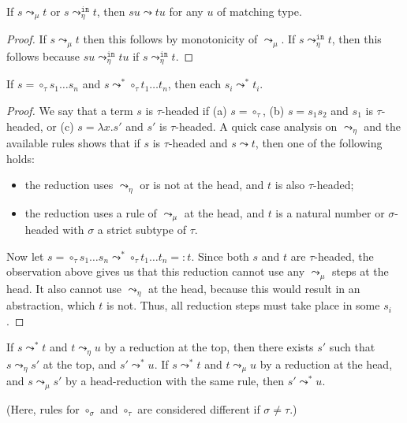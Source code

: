 \documentclass[runningheads,a4paper]{llncs}
\newcommand{\arreta}{\leadsto_\eta}
\newcommand{\arretain}{\leadsto_\eta^{\mathtt{in}}}
\newcommand{\arrnormalise}{\leadsto}
\newcommand{\normstep}{\leadsto_\mu}
\newcommand{\abs}[2]{\lambda #1.#2}
\begin{document}
\begin{lemma}\label{lem_left_monotonicity}
If $s \normstep t$ or $s \arretain t$, then $s u \arrnormalise t u$ for
any $u$ of matching type.
\end{lemma}

\begin{proof}
If $s \normstep t$ then this follows by monotonicity of $\normstep$.
If $s \arretain t$, then this follows because $s u \arretain t u$ if
$s \arretain t$.
\end{proof}

\begin{lemma}\label{lem_preserve_circ}
If $s = \circ_\tau s_1 \ldots s_n$ and $s \arrnormalise^* \circ_\tau
t_1 \ldots t_n$, then each $s_i \arrnormalise^* t_i$.
\end{lemma}

\begin{proof}
We say that a term $s$ is $\tau$-headed if (a) $s = \circ_\tau$, (b)
$s = s_1 s_2$ and $s_1$ is $\tau$-headed, or (c) $s = \abs{x}{s'}$ and
$s'$ is $\tau$-headed.  A quick case analysis on $\arreta$ and the
available rules shows that if $s$ is $\tau$-headed and $s \arrnormalise
t$, then one of the following holds:
\begin{itemize}
\item the reduction uses $\arreta$ or is not at the head, and $t$ is
  also $\tau$-headed;
\item the reduction uses a rule of $\normstep$ at the head, and $t$ is
  a natural number or $\sigma$-headed with $\sigma$ a strict subtype of
  $\tau$.
\end{itemize}

Now let $s = \circ_\tau s_1 \ldots s_n \arrnormalise^* \circ_\tau
t_1 \ldots t_n =: t$.  Since both $s$ and $t$ are $\tau$-headed, the
observation above gives us that this reduction cannot use any $\normstep$
steps at the head.  It also cannot use $\arreta$ at the head, because
this would result in an abstraction, which $t$ is not.  Thus, all
reduction steps must take place in some $s_i$.
\end{proof}

\begin{lemma}\label{lem:top_reduction}
If $s \arrnormalise^* t$ and $t \arreta u$ by a reduction at the top,
then there exists $s'$ such that $s \arreta s'$ at the top, and $s'
\arrnormalise^* u$.
If $s \arrnormalise^* t$ and $t \normstep u$ by a reduction at the head,
and $s \normstep s'$ by a head-reduction with the same rule, then
$s' \arrnormalise^* u$.

(Here, rules for $\circ_\sigma$ and $\circ_\tau$ are considered different
if $\sigma \neq \tau$.)
\end{lemma}
\end{document}
